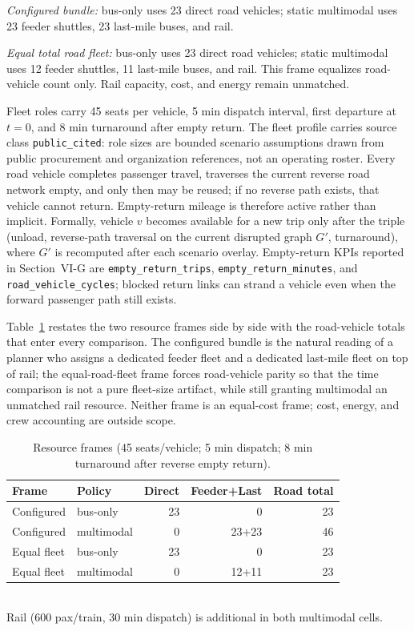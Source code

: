 \documentclass{ieeeaccess}
\begin{document}
\emph{Configured bundle:} bus-only uses 23 direct road vehicles; static multimodal uses 23 feeder shuttles, 23 last-mile buses, and rail.

\emph{Equal total road fleet:} bus-only uses 23 direct road vehicles; static multimodal uses 12 feeder shuttles, 11 last-mile buses, and rail. This frame equalizes road-vehicle count only. Rail capacity, cost, and energy remain unmatched.

Fleet roles carry 45 seats per vehicle, 5 min dispatch interval, first departure at $t=0$, and 8 min turnaround after empty return. The fleet profile carries source class \texttt{public\_\allowbreak cited}: role sizes are bounded scenario assumptions drawn from public procurement and organization references, not an operating roster. Every road vehicle completes passenger travel, traverses the current reverse road network empty, and only then may be reused; if no reverse path exists, that vehicle cannot return. Empty-return mileage is therefore active rather than implicit. Formally, vehicle $v$ becomes available for a new trip only after the triple (unload, reverse-path traversal on the current disrupted graph $G'$, turnaround), where $G'$ is recomputed after each scenario overlay. Empty-return KPIs reported in Section~VI-G are \texttt{empty\_\allowbreak return\_\allowbreak trips}, \texttt{empty\_\allowbreak return\_\allowbreak minutes}, and \texttt{road\_\allowbreak vehicle\_\allowbreak cycles}; blocked return links can strand a vehicle even when the forward passenger path still exists.

Table~\ref{tab:frames} restates the two resource frames side by side with the road-vehicle totals that enter every comparison. The configured bundle is the natural reading of a planner who assigns a dedicated feeder fleet and a dedicated last-mile fleet on top of rail; the equal-road-fleet frame forces road-vehicle parity so that the time comparison is not a pure fleet-size artifact, while still granting multimodal an unmatched rail resource. Neither frame is an equal-cost frame; cost, energy, and crew accounting are outside scope.

\begin{table}[!t]
\caption{Resource frames (45 seats/vehicle; 5 min dispatch; 8 min turnaround after reverse empty return).}
\label{tab:frames}
\centering
\footnotesize
\begin{tabular}{@{}llrrr@{}}
\hline
Frame & Policy & Direct & Feeder+Last & Road total \\
\hline
Configured & bus-only & 23 & 0 & 23 \\
Configured & multimodal & 0 & 23+23 & 46 \\
Equal fleet & bus-only & 23 & 0 & 23 \\
Equal fleet & multimodal & 0 & 12+11 & 23 \\
\hline
\end{tabular}
\\
\footnotesize{Rail (600 pax/train, 30 min dispatch) is additional in both multimodal cells.}
\end{table}
\end{document}

